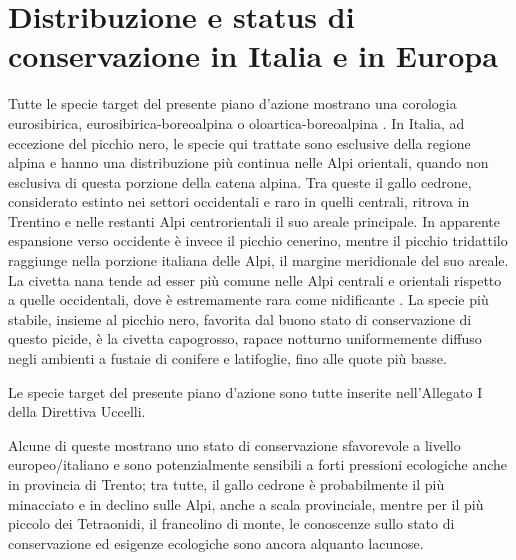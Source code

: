 \documentclass[10pt,twoside,openany,x11names,svgnames,italian,a5paper,dvipsnames,table]{memoir}
\begin{document}
\section{Distribuzione e status di conservazione in Italia e in Europa}
Tutte le specie target del presente piano d'azione mostrano una corologia eurosibirica, eurosibirica-boreoalpina o oloartica-boreoalpina \cite{Boano89}. In Italia, ad eccezione del picchio nero, le specie qui trattate sono esclusive della regione alpina e hanno una distribuzione più continua nelle Alpi orientali, quando non esclusiva di questa porzione della catena alpina. 
Tra queste il gallo cedrone, considerato estinto nei settori occidentali e raro in quelli centrali, ritrova in Trentino e nelle restanti Alpi centrorientali il suo areale principale. In apparente espansione verso occidente è invece il picchio cenerino, mentre il picchio tridattilo raggiunge nella porzione italiana delle Alpi, il margine meridionale del suo areale. La civetta nana tende ad esser più comune nelle Alpi centrali e orientali rispetto a quelle occidentali, dove è estremamente rara come nidificante \cite{Brichetti04} \cite{Pedrini05}. La specie più stabile, insieme al picchio nero, favorita dal buono stato di conservazione di questo picide, è la civetta capogrosso, rapace notturno uniformemente diffuso negli ambienti a fustaie di conifere e latifoglie, fino alle quote più basse. 

Le specie target del presente piano d'azione sono tutte inserite nell'Allegato I della Direttiva Uccelli. 

Alcune di queste mostrano uno stato di conservazione sfavorevole a livello europeo/italiano e sono potenzialmente sensibili a forti pressioni ecologiche anche in provincia di Trento; tra tutte, il gallo cedrone è probabilmente il più minacciato e in declino sulle Alpi, anche a scala provinciale, mentre per il più piccolo dei Tetraonidi, il francolino di monte, le conoscenze sullo stato di conservazione ed esigenze ecologiche sono ancora alquanto lacunose.
\end{document}
